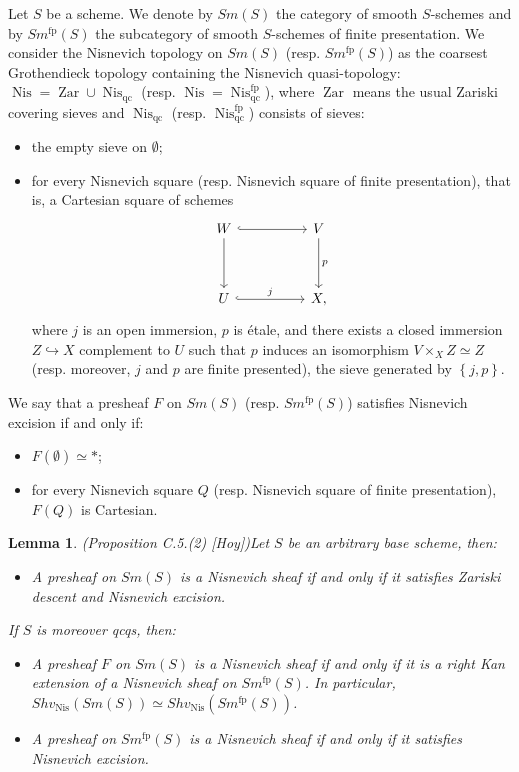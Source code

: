\documentclass{article}
\newtheorem{lm}[thm]{Lemma}
\theoremstyle{definition}
\newcommand{\on}{\operatorname}
\begin{document}
Let $S$ be a scheme. We denote by $Sm(S)$ the category of smooth $S$-schemes and by $Sm^{\on{fp}}(S)$ the subcategory of smooth $S$-schemes of finite presentation. We consider the Nisnevich topology on $Sm(S)$ (resp. $Sm^{\on{fp}}(S)$) as the coarsest Grothendieck topology containing the Nisnevich quasi-topology: $\operatorname{Nis}=\operatorname{Zar} \cup \operatorname{Nis}_{\mathrm{qc}}$ (resp. $\operatorname{Nis}=\operatorname{Nis}^{\on{fp}}_{\mathrm{qc}}$), where $\operatorname{Zar}$ means the usual Zariski covering sieves and $\operatorname{Nis}_{\mathrm{qc}}$ (resp. $\operatorname{Nis}^{\on{fp}}_{\mathrm{qc}}$) consists of sieves:
\begin{itemize}
\item the empty sieve on $\emptyset$;
\item for every Nisnevich square (resp. Nisnevich square of finite presentation), that is, a Cartesian square of schemes
\[\begin{tikzcd}
	W && V \\
	\\
	U && X
	\arrow[hook, from=1-1, to=1-3]
	\arrow[from=1-1, to=3-1]
	\arrow["p", from=1-3, to=3-3]
	\arrow["j", hook, from=3-1, to=3-3],
\end{tikzcd}\]
where $j$ is an open immersion, $p$ is étale, and there exists a closed immersion $Z \hookrightarrow X$ complement to $U$ such that $p$ induces an isomorphism $V \times_X Z \simeq Z$ (resp. moreover, $j$ and $p$ are finite presented), the sieve generated by $\left\{j, p\right\}$.
\end{itemize}
We say that a presheaf $F$ on $Sm(S)$ (resp. $Sm^{\on{fp}}(S)$) satisfies Nisnevich excision if and only if:
\begin{itemize}
\item $F(\emptyset)\simeq\ast$;
\item for every Nisnevich square $Q$ (resp. Nisnevich square of finite presentation), $F(Q)$ is Cartesian. 
\end{itemize}
\begin{lm}(Proposition C.5.(2) [Hoy])\label{Sheaf.Theory.of.Nis.}
Let $S$ be an arbitrary base scheme, then:
\begin{itemize}
\item A presheaf on $Sm(S)$ is a Nisnevich sheaf if and only if it satisfies Zariski descent and Nisnevich excision.
\end{itemize}
If $S$ is moreover qcqs, then:
\begin{itemize}
\item A presheaf $F$ on $Sm(S)$ is a Nisnevich sheaf if and only if it is a right Kan extension of a Nisnevich sheaf on $Sm^{\on{fp}}(S)$. In particular, $Shv_{\on{Nis}}(Sm(S))\simeq Shv_{\on{Nis}}(Sm^{\on{fp}}(S))$.
\item A presheaf on $Sm^{\on{fp}}(S)$ is a Nisnevich sheaf if and only if it satisfies Nisnevich excision.
\end{itemize}
\end{lm}
\end{document}

